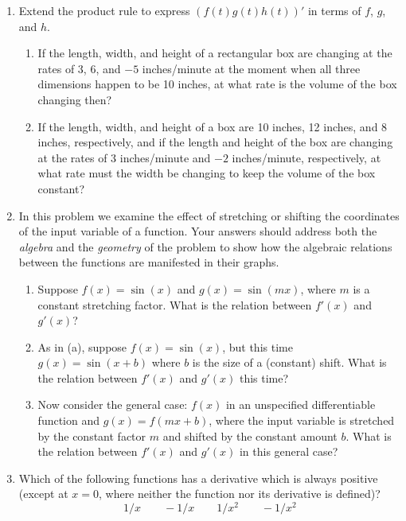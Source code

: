 \begin{enumerate}
l)\enskip\thinspace Estimate the value of $f(t)/g(t)$ at $t=1.95$


\item Extend the product rule to express $(f(t)g(t)h(t))'$ in terms of
$f$, $g$, and $h$.

  \begin{enumerate}
  \item If the length, width, and height of a
rectangular box are changing at the rates of 3, 6, and $-5$
inches/minute at the moment when all three dimensions happen to be 10
inches, at what rate is the volume of the box changing then?

  \item If
the length, width, and height of a box are 10 inches, 12 inches, and 8
inches, respectively, and if the length and height of the box are
changing at the rates of 3 inches/minute and $-2$ inches/minute,
respectively, at what rate must the width be changing to keep the
volume of the box constant?



\end{enumerate}
\item In this problem we examine the effect of stretching or shifting
the coordinates of the input variable of a function.  Your answers
should address both the {\em algebra} and the {\em geometry} of the
problem to show how the algebraic relations between the functions are
manifested in their graphs.

  \begin{enumerate}
  \item Suppose $f(x)=\sin(x)$ and $g(x)= \sin(mx)$, where $m$ is a
constant stretching factor.  What is the relation between $f'(x)$ and
$g'(x)$?

  \item As in (a), suppose $f(x) = \sin(x)$, but this time $g(x) =
\sin(x+b)$ where $b$ is the size of a (constant) shift.  What is the
relation between $f'(x)$ and $g'(x)$ this time?

  \item Now consider the general case: $f(x)$ in an unspecified
differentiable function and $g(x) = f(mx+b)$, where the input variable
is stretched by the constant factor $m$ and shifted by the constant
amount $b$.  What is the relation between $f'(x)$ and $g'(x)$ in this
general case?




\end{enumerate}
\item Which of the following functions has a derivative which is always
positive (except at $x=0$, where neither the function nor its
derivative is defined)?
	\[
1/x \qquad    -1/x   \qquad   1/{x^2}  \qquad -1/{x^2}
\]





\end{enumerate}
